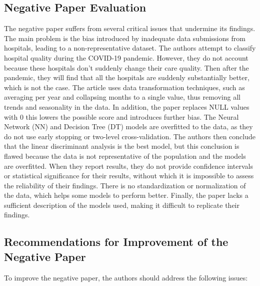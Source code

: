 	\subsection{Negative Paper Evaluation}
		The negative paper suffers from several critical issues that undermine its findings.
		The main problem is the bias introduced by inadequate data submissions from hospitals, leading to a
		non-representative dataset.
		The authors attempt to classify hospital quality during the COVID-19 pandemic.
		However, they do not account because these hospitals don't suddenly change their care quality.
		Then after the pandemic, they will find that all the hospitals are suddenly substantially better, which is
		not the case.
		The article uses data transformation techniques, such as averaging per year and collapsing months to a
		single value, thus removing all trends and seasonality in the data.
		In addition, the paper replaces NULL
		values with 0 this lowers the possible score and introduces further bias.
		The Neural Network (NN) and Decision Tree (DT) models are overfitted to the data, as they do not use early
		stopping or two-level cross-validation.
		The authors then conclude that the linear discriminant analysis is the best model, but this conclusion is
		flawed because the data is not representative of the population and the models are overfitted.
		When they report results, they do not provide confidence intervals or statistical significance for their
		results, without which it is impossible to assess the reliability of their findings.
		There is no standardization or normalization of the data, which helps some models to perform better.
		Finally, the paper lacks a sufficient description of the models used, making it difficult to replicate their findings.

	\subsection{Recommendations for Improvement of the Negative Paper}
		To improve the negative paper, the authors should address the following issues:



